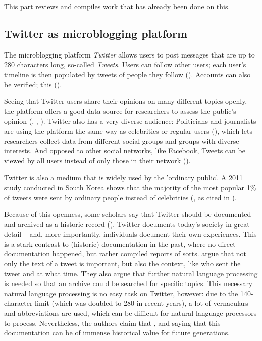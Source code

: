 This part reviews and compiles work that has already been done on this.

\subsection{Twitter as microblogging platform}
The microblogging platform \emph{Twitter} allows users to post messages that are up to 280 characters long, so-called \emph{Tweets}. Users can follow other users; each user's  timeline is then populated by tweets of people they follow (\cite{thimm_twitter_2012}). Accounts can also be verified; this  (\cite{twitter_inc_about_nodate-1}). 

Seeing that Twitter users share their opinions on many different topics openly, the platform offers a good data source for researchers to assess the public's opinion (\cite{pak2010twitter}, \cite{pfaffenberger2016twitter}, \cite{broniatowski2014twitter}). Twitter also has a very diverse audience: Politicians and journalists are using the platform the same way as celebrities or regular users (\cite{pak2010twitter}), which lets researchers collect data from different social groups and groups with diverse interests. And opposed to other social networks, like Facebook, Tweets can be viewed by all users instead of only those in their network (\cite{park_does_2013}).

Twitter is also a medium that is widely used by the 'ordinary public'. A 2011 study conducted in South Korea shows that the majority of the most popular 1\% of tweets were sent by ordinary people instead of celebrities (\cite{chang2011structure}, as cited in \cite{park_does_2013}).

Because of this openness, some scholars say that Twitter should be documented and archived as a historic record (\cite{risse2014documenting}). Twitter documents today's society in great detail -- and, more importantly, individuals document their own experiences. This is a stark contrast to (historic) documentation in the past, where no direct documentation happened, but rather compiled reports of sorts. \citeauthor{risse2014documenting} argue that not only the text of a tweet is important, but also the context, like who sent the tweet and at what time. They also argue that further natural language processing is needed so that an archive could be searched for specific topics. This necessary natural language processing is no easy task on Twitter, however: due to the 140-character-limit (which was doubled to 280 in recent years), a lot of vernaculars and abbreviations are used, which can be difficult for natural language processors to process. Nevertheless, the authors claim that  \cite[9]{risse2014documenting}, and saying that this documentation can be of immense historical value for future generations.

